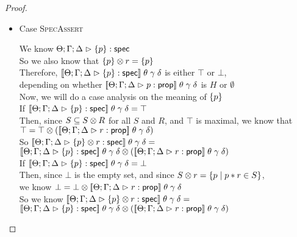 \begin{proof}
\begin{itemize}
    \item Case \textsc{SpecAssert}
      \begin{tabbedproof}
        \oo We know ${\Theta; \Gamma; \Delta} \vartriangleright {\{{p}\}} : \mathsf{spec}$ \\
        \oo So we also know that ${\{{p}\}} \otimes {r} = \{{p}\}$ \\
        \oo Therefore, $[\![{{\Theta; \Gamma; \Delta} \vartriangleright {\{{p}\}} : \mathsf{spec}}]\!]\;\theta\;\gamma\;\delta$ is either $\top$ or $\bot$, \\
        \ox depending on
            whether $[\![{{\Theta; \Gamma; \Delta} \vartriangleright {p} : {\mathsf{prop}}}]\!]\;\theta\;\gamma\;\delta$ is $H$ or $\emptyset$ \\
        \oo Now, we will do a case analysis on the meaning of $\{{p}\}$ \\
        \ooo If $[\![{{\Theta; \Gamma; \Delta} \vartriangleright {\{{p}\}} : \mathsf{spec}}]\!]\;\theta\;\gamma\;\delta = \top$ \\
        \oooo Then, since $S \subseteq {S} \otimes {R}$ for all $S$ and $R$, and $\top$ is maximal, we know that \\
        \oooox $\top = {\top} \otimes {([\![{{\Theta; \Gamma; \Delta} \vartriangleright {r} : {\mathsf{prop}}}]\!]\;\theta\;\gamma\;\delta)}$ \\
        \oooo So $[\![{{\Theta; \Gamma; \Delta} \vartriangleright {{\{{p}\}} \otimes {r}} : \mathsf{spec}}]\!]\;\theta\;\gamma\;\delta = $ \\
        \oooox ${[\![{{\Theta; \Gamma; \Delta} \vartriangleright {\{{p}\}} : \mathsf{spec}}]\!]\;\theta\;\gamma\;\delta} \otimes {([\![{{\Theta; \Gamma; \Delta} \vartriangleright {r} : {\mathsf{prop}}}]\!]\;\theta\;\gamma\;\delta)}$ \\
        \ooo If $[\![{{\Theta; \Gamma; \Delta} \vartriangleright {\{{p}\}} : \mathsf{spec}}]\!]\;\theta\;\gamma\;\delta = \bot$ \\
        \oooo Then, since $\bot$ is the empty set, and since ${S} \otimes {r} = \{{{p}\;|\;{p * r \in S}}\}$, \\
        \ooooo we know $\bot = {\bot} \otimes {[\![{{\Theta; \Gamma; \Delta} \vartriangleright {r} : {\mathsf{prop}}}]\!]\;\theta\;\gamma\;\delta}$ \\
        \oooo  So we know $[\![{{\Theta; \Gamma; \Delta} \vartriangleright {{\{{p}\}} \otimes {r}} : \mathsf{spec}}]\!]\;\theta\;\gamma\;\delta = $ \\
        \oooox  ${[\![{{\Theta; \Gamma; \Delta} \vartriangleright {\{{p}\}} : \mathsf{spec}}]\!]\;\theta\;\gamma\;\delta} \otimes {([\![{{\Theta; \Gamma; \Delta} \vartriangleright {r} : {\mathsf{prop}}}]\!]\;\theta\;\gamma\;\delta)}$ \\
      \end{tabbedproof}


\end{itemize}
\end{proof}

